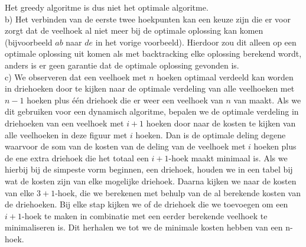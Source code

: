             Het greedy algoritme is dus niet het optimale algoritme.\\

            b) Het verbinden van de eerste twee hoekpunten kan een keuze zijn die er voor zorgt dat de veelhoek al niet meer bij de optimale oplossing kan komen (bijvoorbeeld $ab$ naar $de$ in het vorige voorbeeld). Hierdoor zou dit alleen op een optimale oplossing uit komen als met backtracking elke oplossing berekend wordt, anders is er geen garantie dat de optimale oplossing gevonden is.\\

            c) We observeren dat een veelhoek met $n$ hoeken optimaal verdeeld kan worden in driehoeken door te kijken naar de optimale verdeling van alle veelhoeken met $n-1$ hoeken plus één driehoek die er weer een veelhoek van $n$ van maakt.
            Als we dit gebruiken voor een dynamisch algoritme, bepalen we de optimale verdeling in driehoeken van een veelhoek met $i+1$ hoeken door naar de kosten te kijken van alle veelhoeken in deze figuur met $i$ hoeken. Dan is de optimale deling degene waarvoor de som van de kosten van de deling van de veelhoek met $i$ hoeken plus de ene extra driehoek die het totaal een $i+1$-hoek maakt minimaal is. Als we hierbij bij de simpeste vorm beginnen, een driehoek, houden we in een tabel bij wat de kosten zijn van elke mogelijke driehoek. Daarna kijken we naar de kosten van elke $3+1$-hoek, die we berekenen met behulp van de al berekende kosten van de driehoeken. Bij elke stap kijken we of de driehoek die we toevoegen om een $i+1$-hoek te maken in combinatie met een eerder berekende veelhoek te minimaliseren is. Dit herhalen we tot we de minimale kosten hebben van een n-hoek.\\
